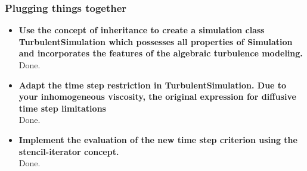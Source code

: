 \documentclass[a4paper]{article}
\begin{document}
\subsubsection{Plugging things together}
\begin{itemize}
	\item \textbf{Use the concept of inheritance to create a simulation class TurbulentSimulation which possesses all properties of Simulation and incorporates the features of the algebraic turbulence modeling.}\\
	Done.
	\item \textbf{Adapt the time step restriction in TurbulentSimulation. Due to your inhomogeneous viscosity, the original expression for diffusive time step limitations}\\
	Done.
	\item \textbf{Implement the evaluation of the new time step criterion using the stencil-iterator concept.}\\
	Done.
	
	
\end{itemize}
\end{document}
